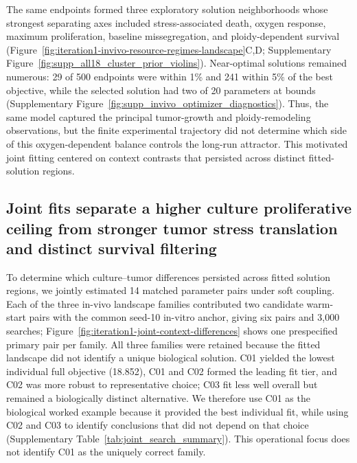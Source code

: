 \documentclass[11pt]{article}
\begin{document}
The same endpoints formed three exploratory solution neighborhoods whose strongest separating axes included stress-associated death, oxygen response, maximum proliferation, baseline missegregation, and ploidy-dependent survival (Figure~\ref{fig:iteration1-invivo-resource-regimes-landscape}C,D; Supplementary Figure~\ref{fig:supp_all18_cluster_prior_violins}). Near-optimal solutions remained numerous: 29 of 500 endpoints were within 1\% and 241 within 5\% of the best objective, while the selected solution had two of 20 parameters at bounds (Supplementary Figure~\ref{fig:supp_invivo_optimizer_diagnostics}). Thus, the same model captured the principal tumor-growth and ploidy-remodeling observations, but the finite experimental trajectory did not determine which side of this oxygen-dependent balance controls the long-run attractor. This motivated joint fitting centered on context contrasts that persisted across distinct fitted-solution regions.

\subsection*{Joint fits separate a higher culture proliferative ceiling from stronger tumor stress translation and distinct survival filtering}

To determine which culture--tumor differences persisted across fitted solution regions, we jointly estimated 14 matched parameter pairs under soft coupling. Each of the three in-vivo landscape families contributed two candidate warm-start pairs with the common seed-10 in-vitro anchor, giving six pairs and 3,000 searches; Figure~\ref{fig:iteration1-joint-context-differences} shows one prespecified primary pair per family. All three families were retained because the fitted landscape did not identify a unique biological solution. C01 yielded the lowest individual full objective (18.852), C01 and C02 formed the leading fit tier, and C02 was more robust to representative choice; C03 fit less well overall but remained a biologically distinct alternative. We therefore use C01 as the biological worked example because it provided the best individual fit, while using C02 and C03 to identify conclusions that did not depend on that choice (Supplementary Table~\ref{tab:joint_search_summary}). This operational focus does not identify C01 as the uniquely correct family.
\end{document}
